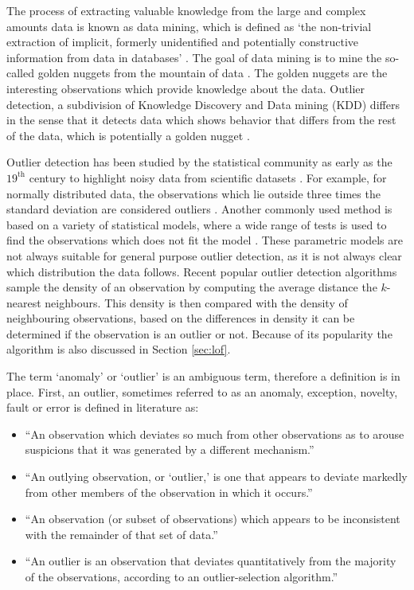 The process of extracting valuable knowledge from the large and complex amounts data is known as data mining, which is defined as `the non-trivial extraction of implicit, formerly unidentified and potentially constructive information from data in databases' \cite{Zaiane99introductionto,Kantardzic:2002:DMC:581837}. The goal of data mining is to mine the so-called golden nuggets from the mountain of data \cite{1347303}. The golden nuggets are the interesting observations which provide knowledge about the data. Outlier detection, a subdivision of Knowledge Discovery and Data mining (KDD) differs in the sense that it detects data which shows behavior that differs from the rest of the data, which is potentially a golden nugget \cite{Chandola:2009:ADS:1541880.1541882}.

Outlier detection has been studied by the statistical community as early as the $19^{\text{th}}$ century to highlight noisy data from scientific datasets \cite{14786448708628471}. For example, for normally distributed data, the observations which lie outside three times the standard deviation are considered outliers \cite{9783540262565}. Another commonly used method is based on a variety of statistical models, where a wide range of tests is used to find the observations which does not fit the model \cite{barnett1994outliers}. These parametric models are not always suitable for general purpose outlier detection, as it is not always clear which distribution the data follows. Recent popular outlier detection algorithms sample the density of an observation by computing the average distance the $k$-nearest neighbours. This density is then compared with the density of neighbouring observations, based on the differences in density it can be determined if the observation is an outlier or not. Because of its popularity the algorithm is also discussed in Section 
\ref{sec:lof}.

The term `anomaly' or `outlier' is an ambiguous term, therefore a definition is in place. First, an outlier, sometimes referred to as an anomaly, exception, novelty, fault or error is defined in literature as:
\begin{itemize}
  \item ``An observation which deviates so much from other observations as to arouse suspicions that it was generated by a different mechanism.'' \cite{Enderlein1987}
  \item ``An outlying observation, or ‘outlier,’ is one that appears to deviate markedly from other members of the observation in which it occurs.'' \cite{Grubbs1969}
  \item ``An observation (or subset of observations) which appears to be inconsistent with the remainder of that set of data.'' \cite{barnett1994outliers}
  \item ``An outlier is an observation that deviates quantitatively from the majority of the observations, according to an outlier-selection algorithm.'' \cite{outlierselection}
\end{itemize}

